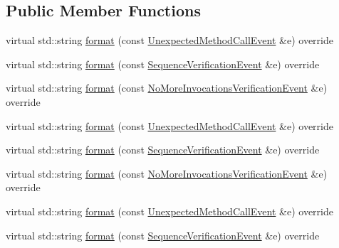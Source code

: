 \subsection*{Public Member Functions}
\begin{DoxyCompactItemize}
\item 
virtual std\+::string \mbox{\hyperlink{structfakeit_1_1DefaultEventFormatter_a8889e692f6ef77c543d07897d659d82b}{format}} (const \mbox{\hyperlink{structfakeit_1_1UnexpectedMethodCallEvent}{Unexpected\+Method\+Call\+Event}} \&e) override
\item 
virtual std\+::string \mbox{\hyperlink{structfakeit_1_1DefaultEventFormatter_a51d3e08835bb3b26ed615b004018a038}{format}} (const \mbox{\hyperlink{structfakeit_1_1SequenceVerificationEvent}{Sequence\+Verification\+Event}} \&e) override
\item 
virtual std\+::string \mbox{\hyperlink{structfakeit_1_1DefaultEventFormatter_afb224f9544f3a399cd95b57d90f2285b}{format}} (const \mbox{\hyperlink{structfakeit_1_1NoMoreInvocationsVerificationEvent}{No\+More\+Invocations\+Verification\+Event}} \&e) override
\item 
virtual std\+::string \mbox{\hyperlink{structfakeit_1_1DefaultEventFormatter_a8889e692f6ef77c543d07897d659d82b}{format}} (const \mbox{\hyperlink{structfakeit_1_1UnexpectedMethodCallEvent}{Unexpected\+Method\+Call\+Event}} \&e) override
\item 
virtual std\+::string \mbox{\hyperlink{structfakeit_1_1DefaultEventFormatter_a51d3e08835bb3b26ed615b004018a038}{format}} (const \mbox{\hyperlink{structfakeit_1_1SequenceVerificationEvent}{Sequence\+Verification\+Event}} \&e) override
\item 
virtual std\+::string \mbox{\hyperlink{structfakeit_1_1DefaultEventFormatter_afb224f9544f3a399cd95b57d90f2285b}{format}} (const \mbox{\hyperlink{structfakeit_1_1NoMoreInvocationsVerificationEvent}{No\+More\+Invocations\+Verification\+Event}} \&e) override
\item 
virtual std\+::string \mbox{\hyperlink{structfakeit_1_1DefaultEventFormatter_a8889e692f6ef77c543d07897d659d82b}{format}} (const \mbox{\hyperlink{structfakeit_1_1UnexpectedMethodCallEvent}{Unexpected\+Method\+Call\+Event}} \&e) override
\item 
virtual std\+::string \mbox{\hyperlink{structfakeit_1_1DefaultEventFormatter_a51d3e08835bb3b26ed615b004018a038}{format}} (const \mbox{\hyperlink{structfakeit_1_1SequenceVerificationEvent}{Sequence\+Verification\+Event}} \&e) override
\item 

\end{DoxyCompactItemize}
